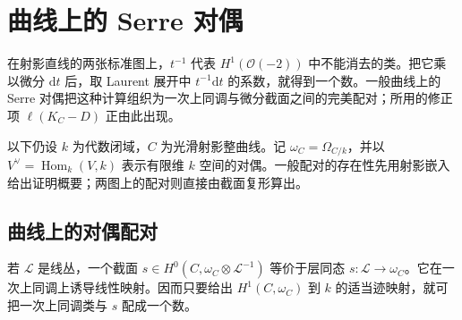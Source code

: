 
\section{曲线上的 Serre 对偶}
\label{b3:sec:H03}

在射影直线的两张标准图上，\(t^{-1}\) 代表 \(H^1(\mathcal O(-2))\) 中不能消去的类。把它乘以微分 \(\mathrm{d}t\) 后，取 Laurent 展开中 \(t^{-1}\mathrm{d}t\) 的系数，就得到一个数。一般曲线上的 Serre 对偶把这种计算组织为一次上同调与微分截面之间的完美配对；所用的修正项 \(\ell(K_C-D)\) 正由此出现。

\ProseParagraphBreak
以下仍设 \(k\) 为代数闭域，\(C\) 为光滑射影整曲线。记 \(\omega_C=\Omega_{C/k}\)，并以 \(V^\vee=\operatorname{Hom}_k(V,k)\) 表示有限维 \(k\) 空间的对偶。一般配对的存在性先用射影嵌入给出证明概要；两图上的配对则直接由截面复形算出。

\subsection{曲线上的对偶配对}
\label{b3:subsec:H03:01}

若 \(\mathcal L\) 是线丛，一个截面 \(s\in H^0(C,\omega_C\otimes\mathcal L^{-1})\) 等价于层同态 \(s:\mathcal L\rightarrow\omega_C\)。它在一次上同调上诱导线性映射。因而只要给出 \(H^1(C,\omega_C)\) 到 \(k\) 的适当迹映射，就可把一次上同调类与 \(s\) 配成一个数。

